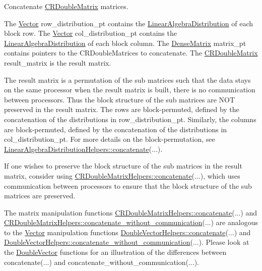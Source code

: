 Concatenate \hyperlink{classoomph_1_1CRDoubleMatrix}{C\+R\+Double\+Matrix} matrices. 

The \hyperlink{classoomph_1_1Vector}{Vector} row\+\_\+distribution\+\_\+pt contains the \hyperlink{classoomph_1_1LinearAlgebraDistribution}{Linear\+Algebra\+Distribution} of each block row. The \hyperlink{classoomph_1_1Vector}{Vector} col\+\_\+distribution\+\_\+pt contains the \hyperlink{classoomph_1_1LinearAlgebraDistribution}{Linear\+Algebra\+Distribution} of each block column. The \hyperlink{classoomph_1_1DenseMatrix}{Dense\+Matrix} matrix\+\_\+pt contains pointers to the C\+R\+Double\+Matrices to concatenate. The \hyperlink{classoomph_1_1CRDoubleMatrix}{C\+R\+Double\+Matrix} result\+\_\+matrix is the result matrix.

The result matrix is a permutation of the sub matrices such that the data stays on the same processor when the result matrix is built, there is no communication between processors. Thus the block structure of the sub matrices are N\+OT preserved in the result matrix. The rows are block-\/permuted, defined by the concatenation of the distributions in row\+\_\+distribution\+\_\+pt. Similarly, the columns are block-\/permuted, defined by the concatenation of the distributions in col\+\_\+distribution\+\_\+pt. For more details on the block-\/permutation, see \hyperlink{namespaceoomph_1_1LinearAlgebraDistributionHelpers_ad3ba423fba64e7db91e9155efa7df5d0}{Linear\+Algebra\+Distribution\+Helpers\+::concatenate}(...).

If one wishes to preserve the block structure of the sub matrices in the result matrix, consider using \hyperlink{namespaceoomph_1_1CRDoubleMatrixHelpers_aba5724bb1f89625f601045ba6ad139bf}{C\+R\+Double\+Matrix\+Helpers\+::concatenate}(...), which uses communication between processors to ensure that the block structure of the sub matrices are preserved.

The matrix manipulation functions \hyperlink{namespaceoomph_1_1CRDoubleMatrixHelpers_aba5724bb1f89625f601045ba6ad139bf}{C\+R\+Double\+Matrix\+Helpers\+::concatenate}(...) and \hyperlink{namespaceoomph_1_1CRDoubleMatrixHelpers_ab335593fd53dbb5162fd63f14db95377}{C\+R\+Double\+Matrix\+Helpers\+::concatenate\+\_\+without\+\_\+communication}(...) are analogous to the \hyperlink{classoomph_1_1Vector}{Vector} manipulation functions \hyperlink{namespaceoomph_1_1DoubleVectorHelpers_ae5259ed3ae48ad417c743de0166884f8}{Double\+Vector\+Helpers\+::concatenate}(...) and \hyperlink{namespaceoomph_1_1DoubleVectorHelpers_ac69d6979ffbf4987684c0e025d107947}{Double\+Vector\+Helpers\+::concatenate\+\_\+without\+\_\+communication}(...). Please look at the \hyperlink{classoomph_1_1DoubleVector}{Double\+Vector} functions for an illustration of the differences between concatenate(...) and concatenate\+\_\+without\+\_\+communication(...).

